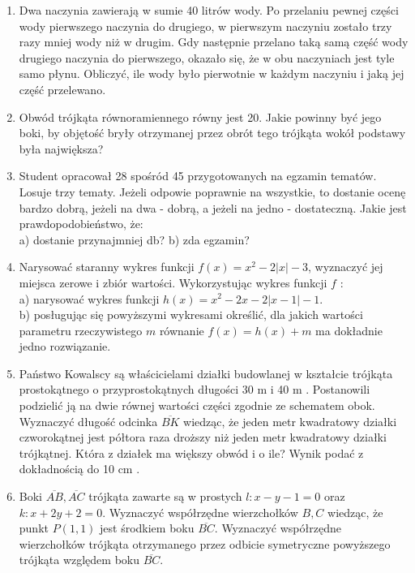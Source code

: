 \documentclass[10pt]{article}
\begin{document}
\begin{enumerate}
  \item Dwa naczynia zawierają w sumie 40 litrów wody. Po przelaniu pewnej części wody pierwszego naczynia do drugiego, w pierwszym naczyniu zostało trzy razy mniej wody niż w drugim. Gdy następnie przelano taką samą część wody drugiego naczynia do pierwszego, okazało się, że w obu naczyniach jest tyle samo płynu. Obliczyć, ile wody było pierwotnie w każdym naczyniu i jaką jej część przelewano.
  \item Obwód trójkąta równoramiennego równy jest 20. Jakie powinny być jego boki, by objętość bryły otrzymanej przez obrót tego trójkąta wokół podstawy była największa?
  \item Student opracował 28 spośród 45 przygotowanych na egzamin tematów. Losuje trzy tematy. Jeżeli odpowie poprawnie na wszystkie, to dostanie ocenę bardzo dobrą, jeżeli na dwa - dobrą, a jeżeli na jedno - dostateczną. Jakie jest prawdopodobieństwo, że:\\
a) dostanie przynajmniej db? b) zda egzamin?
  \item Narysować staranny wykres funkcji $f(x)=x^{2}-2|x|-3$, wyznaczyć jej miejsca zerowe i zbiór wartości. Wykorzystując wykres funkcji $f$ :\\
a) narysować wykres funkcji $h(x)=x^{2}-2 x-2|x-1|-1$.\\
b) posługując się powyższymi wykresami określić, dla jakich wartości parametru rzeczywistego $m$ równanie $f(x)=h(x)+m$ ma dokładnie jedno rozwiązanie.
  \item Państwo Kowalscy są właścicielami działki budowlanej w kształcie trójkąta prostokątnego o przyprostokątnych długości 30 m i 40 m . Postanowili podzielić ją na dwie równej wartości części zgodnie ze schematem obok. Wyznaczyć długość odcinka $\overline{B K}$ wiedząc, że jeden metr kwadratowy działki czworokątnej jest półtora raza droższy niż jeden metr kwadratowy działki trójkątnej. Która z działek ma większy obwód i o ile? Wynik podać z dokładnością do 10 cm .
  \item Boki $\overline{A B}, \overline{A C}$ trójkąta zawarte są w prostych $l: x-y-1=0$ oraz $k: x+2 y+2=0$. Wyznaczyć współrzędne wierzchołków $B, C$ wiedząc, że punkt $P(1,1)$ jest środkiem boku $\overline{B C}$. Wyznaczyć współrzędne wierzchołków trójkąta otrzymanego przez odbicie symetryczne powyższego trójkąta względem boku $\overline{B C}$.
\end{enumerate}
\end{document}
